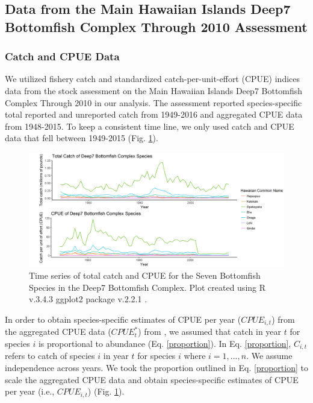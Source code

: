 \documentclass[oneside,12pt,final]{sty/ucthesis-CA2012}
\let\cite\citep                             %
\begin{document}
\begin{mainmatter}
\subsection*{Data from the Main Hawaiian Islands Deep7 Bottomfish Complex Through 2010 Assessment}
\subsubsection*{Catch and CPUE Data}
We utilized fishery catch and standardized catch-per-unit-effort (CPUE) indices data from the stock assessment on the Main Hawaiian Islands Deep7 Bottomfish Complex Through 2010 \cite{langseth2018stock} in our analysis. The assessment reported species-specific total reported and unreported catch from 1949-2016 and aggregated CPUE data from 1948-2015. To keep a consistent time line, we only used catch and CPUE data that fell between 1949-2015 (Fig. \ref{catchandcpue}).

\begin{figure}[H]
     \centering
       \includegraphics[width=\textwidth]{fig/catch_cpue}
    \caption{Time series of total catch and CPUE for the Seven Bottomfish Species in the Deep7 Bottomfish Complex. Plot created using R v.3.4.3 \cite{Rcite} ggplot2 package v.2.2.1 \cite{ggplot}. }
    \label{catchandcpue}
\end{figure}

In order to obtain species-specific estimates of CPUE per year ($CPUE_{i,t}$) from the aggregated CPUE data ($CPUE_t^*$) from \cite{langseth2018stock}, we assumed that catch in year $t$ for species $i$ is proportional to abundance (Eq. \ref{proportion}). In Eq. \ref{proportion}, $C_{i,t}$ refers to catch of species $i$ in year $t$ for species $i$ where $i=1,\dots,n$. We assume independence across years. We took the proportion outlined in Eq. \ref{proportion} to scale the aggregated CPUE data and obtain species-specific estimates of CPUE per year (i.e., $CPUE_{i,t}$) (Fig. \ref{catchandcpue}).


\end{mainmatter}
\end{document}
